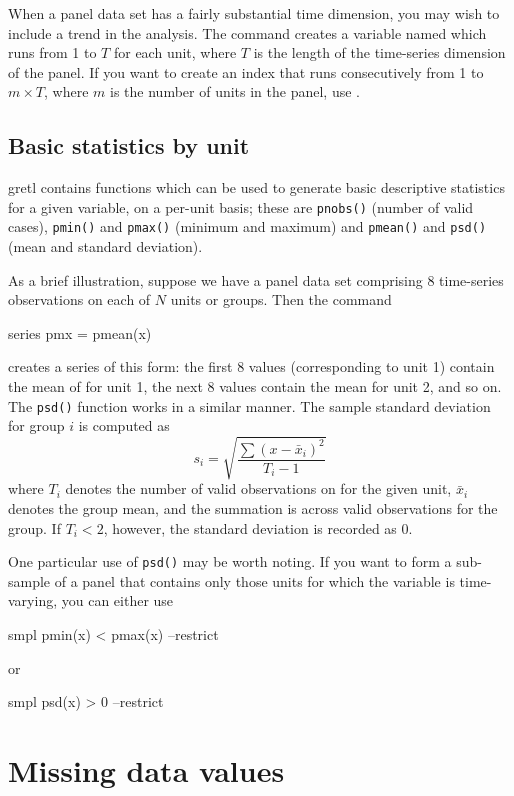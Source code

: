 When a panel data set has a fairly substantial time dimension, you may
wish to include a trend in the analysis.  The command  
creates a variable named  which runs from 1 to $T$ for
each unit, where $T$ is the length of the time-series dimension of the
panel.  If you want to create an index that runs consecutively from 1
to $m\times T$, where $m$ is the number of units in the panel, use
.

\subsection{Basic statistics by unit}
\label{panel-stats}

gretl contains functions which can be used to generate basic
descriptive statistics for a given variable, on a per-unit basis;
these are \texttt{pnobs()} (number of valid cases), \texttt{pmin()}
and \texttt{pmax()} (minimum and maximum) and \texttt{pmean()} and
\texttt{psd()} (mean and standard deviation).

As a brief illustration, suppose we have a panel data set comprising 8
time-series observations on each of $N$ units or groups.  Then the
command
%
\begin{code}
series pmx = pmean(x)
\end{code}
%
creates a series of this form: the first 8 values (corresponding to
unit 1) contain the mean of  for unit 1, the next 8 values
contain the mean for unit 2, and so on.  The \texttt{psd()} function
works in a similar manner.  The sample standard deviation for group
$i$ is computed as
\[
s_i = \sqrt{\frac{\sum(x-\bar{x}_i)^2}{T_i-1}}
\]
where $T_i$ denotes the number of valid observations on 
for the given unit, $\bar{x}_i$ denotes the group mean, and the
summation is across valid observations for the group.  If $T_i < 2$,
however, the standard deviation is recorded as 0.

One particular use of \texttt{psd()} may be worth noting.  If you want
to form a sub-sample of a panel that contains only those units for
which the variable  is time-varying, you can either use 
%
\begin{code}
smpl pmin(x) < pmax(x) --restrict
\end{code}
or
%
\begin{code}
smpl psd(x) > 0 --restrict
\end{code}

\section{Missing data values}
\label{missing-data}


